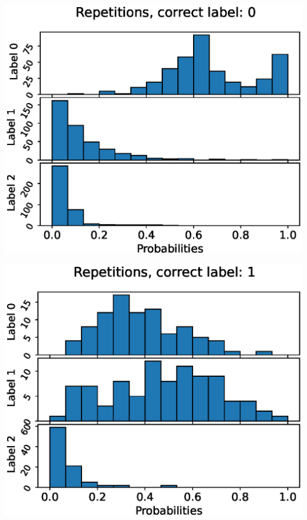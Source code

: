 \begin{center}
\begin{minipage}{0.33\textwidth}
  \includegraphics[width=\textwidth]{files/figs/app/hists/kmfp/r0.eps}
\end{minipage}%
\begin{minipage}{0.33\textwidth}
  \includegraphics[width=\textwidth]{files/figs/app/hists/kmfp/r1.eps}
\end{minipage}%
\begin{minipage}{0.33\textwidth}

\end{minipage}
\end{center}

